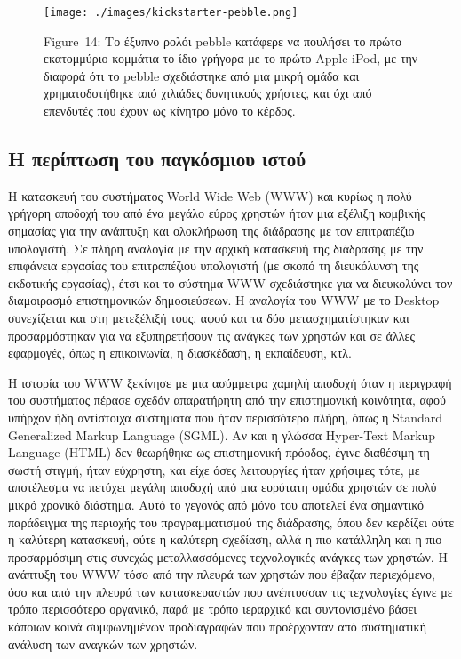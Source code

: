 \documentclass[
]{article}
\begin{document}
\leavevmode{}%
\begin{figure}
\hypertarget{fig:kickstarter-pebble}{%
\centering
\texttt{[image: ./images/kickstarter-pebble.png]}
\caption{Figure~14: Το έξυπνο ρολόι pebble κατάφερε να πουλήσει το πρώτο
εκατομμύριο κομμάτια το ίδιο γρήγορα με το πρώτο Apple iPod, με την
διαφορά ότι το pebble σχεδιάστηκε από μια μικρή ομάδα και
χρηματοδοτήθηκε από χιλιάδες δυνητικούς χρήστες, και όχι από επενδυτές
που έχουν ως κίνητρο μόνο το κέρδος.}\label{fig:kickstarter-pebble}
}
\end{figure}

\hypertarget{ux3b7-ux3c0ux3b5ux3c1ux3afux3c0ux3c4ux3c9ux3c3ux3b7-ux3c4ux3bfux3c5-ux3c0ux3b1ux3b3ux3baux3ccux3c3ux3bcux3b9ux3bfux3c5-ux3b9ux3c3ux3c4ux3bfux3cd}{%
\subsection{Η περίπτωση του παγκόσμιου
ιστού}\label{ux3b7-ux3c0ux3b5ux3c1ux3afux3c0ux3c4ux3c9ux3c3ux3b7-ux3c4ux3bfux3c5-ux3c0ux3b1ux3b3ux3baux3ccux3c3ux3bcux3b9ux3bfux3c5-ux3b9ux3c3ux3c4ux3bfux3cd}}

Η κατασκευή του συστήματος World Wide Web (WWW) και κυρίως η πολύ
γρήγορη αποδοχή του από ένα μεγάλο εύρος χρηστών ήταν μια εξέλιξη
κομβικής σημασίας για την ανάπτυξη και ολοκλήρωση της διάδρασης με τον
επιτραπέζιο υπολογιστή. Σε πλήρη αναλογία με την αρχική κατασκευή της
διάδρασης με την επιφάνεια εργασίας του επιτραπέζιου υπολογιστή (με
σκοπό τη διευκόλυνση της εκδοτικής εργασίας), έτσι και το σύστημα WWW
σχεδιάστηκε για να διευκολύνει τον διαμοιρασμό επιστημονικών
δημοσιεύσεων. Η αναλογία του WWW με το Desktop συνεχίζεται και στη
μετεξέλιξή τους, αφού και τα δύο μετασχηματίστηκαν και προσαρμόστηκαν
για να εξυπηρετήσουν τις ανάγκες των χρηστών και σε άλλες εφαρμογές,
όπως η επικοινωνία, η διασκέδαση, η εκπαίδευση, κτλ.

Η ιστορία του WWW ξεκίνησε με μια ασύμμετρα χαμηλή αποδοχή όταν η
περιγραφή του συστήματος πέρασε σχεδόν απαρατήρητη από την επιστημονική
κοινότητα, αφού υπήρχαν ήδη αντίστοιχα συστήματα που ήταν περισσότερο
πλήρη, όπως η Standard Generalized Markup Language (SGML). Αν και η
γλώσσα Hyper-Text Markup Language (HTML) δεν θεωρήθηκε ως επιστημονική
πρόοδος, έγινε διαθέσιμη τη σωστή στιγμή, ήταν εύχρηστη, και είχε όσες
λειτουργίες ήταν χρήσιμες τότε, με αποτέλεσμα να πετύχει μεγάλη αποδοχή
από μια ευρύτατη ομάδα χρηστών σε πολύ μικρό χρονικό διάστημα. Αυτό το
γεγονός από μόνο του αποτελεί ένα σημαντικό παράδειγμα της περιοχής του
προγραμματισμού της διάδρασης, όπου δεν κερδίζει ούτε η καλύτερη
κατασκευή, ούτε η καλύτερη σχεδίαση, αλλά η πιο κατάλληλη και η πιο
προσαρμόσιμη στις συνεχώς μεταλλασσόμενες τεχνολογικές ανάγκες των
χρηστών. Η ανάπτυξη του WWW τόσο από την πλευρά των χρηστών που έβαζαν
περιεχόμενο, όσο και από την πλευρά των κατασκευαστών που ανέπτυσσαν τις
τεχνολογίες έγινε με τρόπο περισσότερο οργανικό, παρά με τρόπο ιεραρχικό
και συντονισμένο βάσει κάποιων κοινά συμφωνημένων προδιαγραφών που
προέρχονταν από συστηματική ανάλυση των αναγκών των χρηστών.
\end{document}
